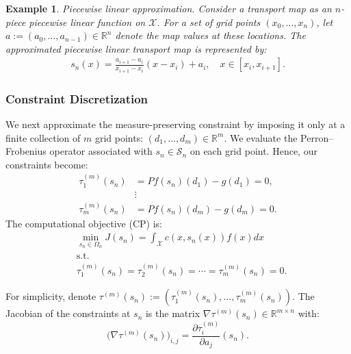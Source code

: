 \documentclass[12pt,leqno]{amsart}
\newtheorem{example}{Example}
\begin{document}
\begin{example}{Piecewise linear approximation.}
Consider a transport map as an $n$-piece piecewise linear function on $\mathcal{X}$. For a set of grid points $(x_0, \dots, x_n)$, let $a:= (a_0, \dots, a_{n-1})\in\mathbb R^n$ denote the map values at these locations. The approximated piecewise linear transport map is represented by:
\begin{align*}
    s_n(x) = \frac{a_{i+1}-a_i}{x_{i+1}-x_i}(x-x_i)+a_i,\quad x\in [x_i, x_{i+1}].
\end{align*}
\end{example}

\subsubsection{Constraint Discretization}
We next approximate the measure-preserving constraint by imposing it only at a finite collection of $m$ grid points: $(d_1, \dots, d_m)\in\mathbb{R}^m$. We evaluate the Perron--Frobenius operator associated with $s_n \in \mathcal{S}_n$ on each grid point. Hence, our constraints become:
\begin{align*}
    \tau_1^{(m)}(s_n) &= Pf(s_n)(d_1)-g(d_1) = 0,\\
    &\vdots\\
    \tau_m^{(m)}(s_n) &= Pf(s_n)(d_m)-g(d_m) = 0.
\end{align*}
The computational objective (CP) is:
\begin{align*}
    &\min_{s_n\in\Omega_n} J(s_n)=\int_{\mathcal{X}} c(x, s_n(x)) f(x)dx \tag{CP}\\
    &\text{s.t.} \\
    & \tau_1^{(m)}(s_n) = \tau_2^{(m)}(s_n) =\cdots=\tau_m^{(m)}(s_n) = 0.
\end{align*}

For simplicity, denote $\tau^{(m)}(s_n) :=(\tau_1^{(m)}(s_n),\dots,\tau_m^{(m)}(s_n))$. The Jacobian of the constraints at $s_n$ is the matrix $\nabla\tau^{(m)}(s_n)\in\mathbb{R}^{m\times n}$ with:
\[
\bigl(\nabla\tau^{(m)}(s_n)\bigr)_{i,j}=\frac{\partial \tau_i^{(m)}}{\partial a_j}(s_n).
\]
\end{document}
